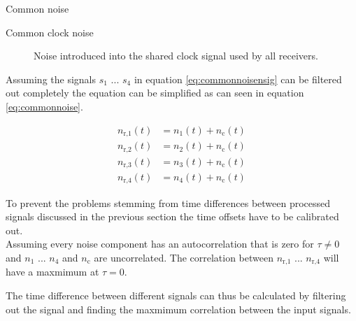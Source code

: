 \begin{subchapter}{Common noise}
\begin{description}
    \item[Common clock noise]
      Noise introduced into the shared clock signal used by all
      receivers.
  \end{description}

  Assuming the signals $s_\text{1}$ ... $s_\text{4}$ in equation
  \ref{eq:commonnoisensig} can be filtered out completely the equation
  can be simplified as can seen in equation \ref{eq:commonnoise}.

  \begin{align}
    \label{eq:commonnoise}
    n_\text{r,1}(t) &= n_\text{1}(t) + n_\text{c}(t) \\
    n_\text{r,2}(t) &= n_\text{2}(t) + n_\text{c}(t) \nonumber \\
    n_\text{r,3}(t) &= n_\text{3}(t) + n_\text{c}(t) \nonumber \\
    n_\text{r,4}(t) &= n_\text{4}(t) + n_\text{c}(t) \nonumber
  \end{align}

  To prevent the problems stemming from time differences between processed
  signals discussed in the previous section the time offsets have
  to be calibrated out. \\

  Assuming every noise component has an autocorrelation that is zero
  for $\tau \neq 0$ and $n_\text{1}$ ... $n_\text{4}$ and $n_\text{c}$
  are uncorrelated. The correlation between
  $n_\text{r,1}$ ... $n_\text{r,4}$ will have a maxmimum at $\tau = 0$.

  The time difference between different signals can thus be
  calculated by filtering out the signal and finding the
  maxmimum correlation between the input signals.
\end{subchapter}

